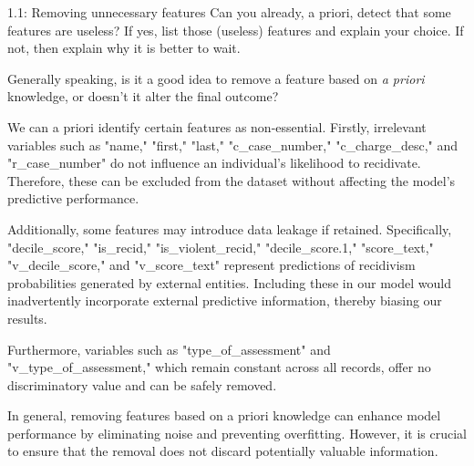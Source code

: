 \documentclass [a4paper, 12pt] {article}
\begin{document}
    {
    \hypersetup{allcolors=black}
    }   
    \clearpage

\renewcommand{\arraystretch}{0.84}

\begin{question}{1.1: Removing unnecessary features}
    Can you already, a priori, detect that some features are useless? If yes, list those (useless) features and explain your choice. If not, then explain why it is better to wait.

    Generally speaking, is it a good idea to remove a feature based on \emph{a priori} knowledge, or doesn't it alter the final outcome?
\end{question}
\begin{answer}\color{blue} 
 We can a priori identify certain features as non-essential. Firstly, irrelevant variables such as "name," "first," "last," "c\_case\_number," "c\_charge\_desc," and "r\_case\_number" do not influence an individual's likelihood to recidivate. Therefore, these can be excluded from the dataset without affecting the model's predictive performance.

Additionally, some features may introduce data leakage if retained. Specifically, "decile\_score," "is\_recid," "is\_violent\_recid," "decile\_score.1," "score\_text," "v\_decile\_score," and "v\_score\_text" represent predictions of recidivism probabilities generated by external entities. Including these in our model would inadvertently incorporate external predictive information, thereby biasing our results.

Furthermore, variables such as "type\_of\_assessment" and "v\_type\_of\_assessment," which remain constant across all records, offer no discriminatory value and can be safely removed.

In general, removing features based on a priori knowledge can enhance model performance by eliminating noise and preventing overfitting. However, it is crucial to ensure that the removal does not discard potentially valuable information.
\end{answer}
\end{document}
